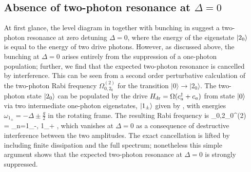 \subsection{Absence of two-photon resonance at $\Delta = 0$}

At first glance,
the level diagram in  together with
bunching 
in  
suggest a two-photon resonance
at zero detuning $\Delta = 0$,
where the energy of the
eigenstate $| 2_0 \rangle$ is equal to the energy of two drive photons.
However, 
as discussed above,
the bunching at $\Delta = 0$ arises 
entirely from
the suppression of a one-photon population;
further, we 
find that the expected two-photon resonance is 
cancelled by  interference.
This can be seen from a second order perturbative 
calculation of the two-photon Rabi frequency $\Omega_{0,2_0}^{(2)}$ for the transition 
$|0\rangle\rightarrow |2_0\rangle$.  
The two-photon state $| 2_0 \rangle$ can be
populated by the drive 
$H_{\rm dr} = \Omega (c_a^\dag + c_a)$ 
from state $| 0 \rangle$ 
via two intermediate one-photon
eigenstates, $| 1_\pm \rangle$ given by ,
with energies $\omega_{1_\pm} = -\Delta \pm \frac{g}{2}$
in the rotating frame.
The resulting Rabi frequency is
\bel
\label{eq:fgr}
	\Omega_{0,2_0}^{(2)} = \sum_{n=1_-, 1_+}
,
\eel
which vanishes at $\Delta=0$ 
as a consequence of destructive interference between the two amplitudes. 
The exact cancellation is lifted
by including finite dissipation and the full spectrum;
nonetheless this simple argument shows that
the expected two-photon resonance at $\Delta = 0$
is strongly 
suppressed.







